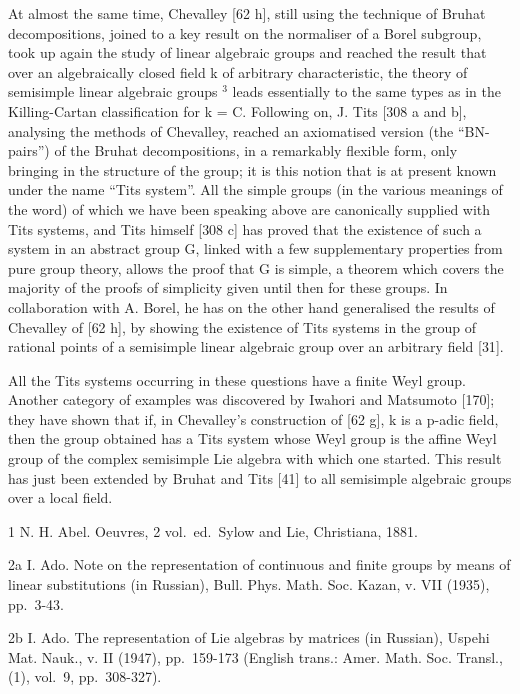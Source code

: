 At almost the same time, Chevalley {[}62 h{]}, still using the technique of Bruhat decompositions, joined to a key result on the normaliser of a Borel subgroup, took up again the study of linear algebraic groups and reached the result that over an algebraically closed field k of arbitrary characteristic, the theory of semisimple linear algebraic groups \(^{3}\) leads essentially to the same types as in the Killing-Cartan classification for k = C. Following on, J. Tits {[}308 a and b{]}, analysing the methods of Chevalley, reached an axiomatised version (the ``BN-pairs'') of the Bruhat decompositions, in a remarkably flexible form, only bringing in the structure of the group; it is this notion that is at present known under the name ``Tits system''. All the simple groups (in the various meanings of the word) of which we have been speaking above are canonically supplied with Tits systems, and Tits himself {[}308 c{]} has proved that the existence of such a system in an abstract group G, linked with a few supplementary properties from pure group theory, allows the proof that G is simple, a theorem which covers the majority of the proofs of simplicity given until then for these groups. In collaboration with A. Borel, he has on the other hand generalised the results of Chevalley of {[}62 h{]}, by showing the existence of Tits systems in the group of rational points of a semisimple linear algebraic group over an arbitrary field {[}31{]}.

All the Tits systems occurring in these questions have a finite Weyl group. Another category of examples was discovered by Iwahori and Matsumoto {[}170{]}; they have shown that if, in Chevalley's construction of {[}62 g{]}, k is a p-adic field, then the group obtained has a Tits system whose Weyl group is the affine Weyl group of the complex semisimple Lie algebra with which one started. This result has just been extended by Bruhat and Tits {[}41{]} to all semisimple algebraic groups over a local field.


1 N. H. Abel. Oeuvres, 2 vol.~ed.~Sylow and Lie, Christiana, 1881.

2a I. Ado. Note on the representation of continuous and finite groups by means of linear substitutions (in Russian), Bull. Phys. Math. Soc. Kazan, v. VII (1935), pp.~3-43.

2b I. Ado. The representation of Lie algebras by matrices (in Russian), Uspehi Mat. Nauk., v. II (1947), pp.~159-173 (English trans.: Amer. Math. Soc. Transl., (1), vol.~9, pp.~308-327).

